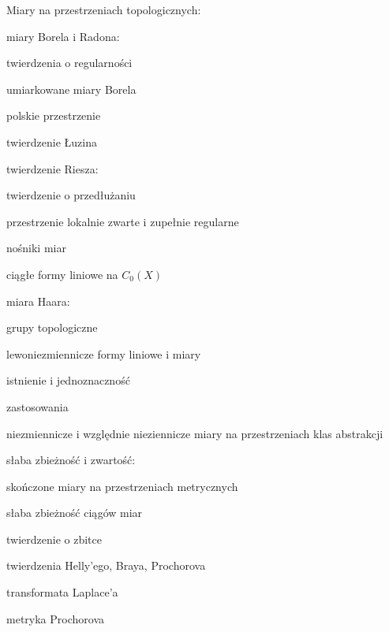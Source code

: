 Miary na przestrzeniach topologicznych:
\begin{enumx}
\item miary Borela i Radona: 
\begin{itemx}
\item twierdzenia o regularności
\item umiarkowane miary Borela
\item polskie przestrzenie
\item twierdzenie Łuzina
\end{itemx}
\item twierdzenie Riesza: 
\begin{itemx}
\item twierdzenie o przedłużaniu
\item przestrzenie lokalnie zwarte i zupełnie regularne
\item nośniki miar
\item ciągłe formy liniowe na $C_0(X)$
\end{itemx}
\item miara Haara: 
\begin{itemx}
\item grupy topologiczne
\item lewoniezmiennicze formy liniowe i miary
\item istnienie i jednoznaczność
\item zastosowania
\item niezmiennicze i względnie nieziennicze miary na przestrzeniach klas abstrakcji
\end{itemx}
\item słaba zbieżność i zwartość: 
\begin{itemx}
\item skończone miary na przestrzeniach metrycznych
\item słaba zbieżność ciągów miar
\item twierdzenie o zbitce
\item twierdzenia Helly'ego, Braya, Prochorova
\item transformata Laplace'a
\item metryka Prochorova
\end{itemx}
\end{enumx}
